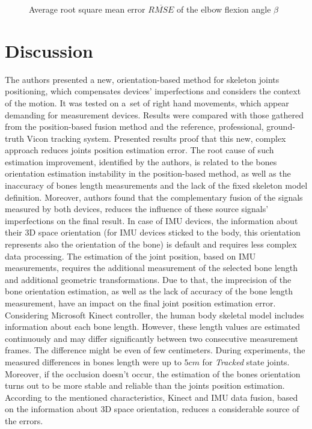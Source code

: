 \documentclass[sensors,article,submit,moreauthors,pdftex,10pt,a4paper]{mdpi}
\begin{document}
	\begin{figure}[H] %
		\centering
		
		\caption{Average root square mean error $\overline{RMSE}$ of the elbow flexion angle $\beta$}
		\label{fig:results:elbowAngleError}
	\end{figure}
		
	\section{Discussion}
		
	The authors presented a new, orientation-based method for skeleton joints positioning, which compensates devices' imperfections and considers the context of the motion. It was tested on a~set of right hand movements, which appear demanding for measurement devices. Results were compared with those gathered from the position-based fusion method and the reference, professional, ground-truth Vicon tracking system. Presented results proof that this new, complex approach reduces joints position estimation error. The root cause of such estimation improvement, identified by the authors, is related to the bones orientation estimation instability in the position-based method, as well as the inaccuracy of bones length measurements and the lack of the fixed skeleton model definition. Moreover, authors found that the complementary fusion of the signals measured by both devices, reduces the influence of these source signals' imperfections on the final result.
	In case of IMU devices, the information about their 3D space orientation (for IMU devices sticked to the body, this orientation represents also the orientation of the bone) is default and requires less complex data processing. The estimation of the joint position, based on IMU measurements, requires the additional measurement of the selected bone length and additional geometric transformations. Due to that, the imprecision of the bone orientation estimation, as well as the lack of accuracy of the bone length measurement, have an impact on the final joint position estimation error.
	Considering Microsoft Kinect controller, the human body skeletal model includes information about each bone length. However, these length values are estimated continuously and may differ significantly between two consecutive measurement frames. The difference might be even of few centimeters. During experiments, the measured differences in bones length were up to $5cm$ for \emph{Tracked} state joints.  Moreover, if the occlusion doesn't occur, the estimation of the bones orientation turns out to be more stable and reliable than the joints position estimation. 
	According to the mentioned characteristics, Kinect and IMU data fusion, based on the information about 3D space orientation, reduces a considerable source of the errors.
\end{document}

